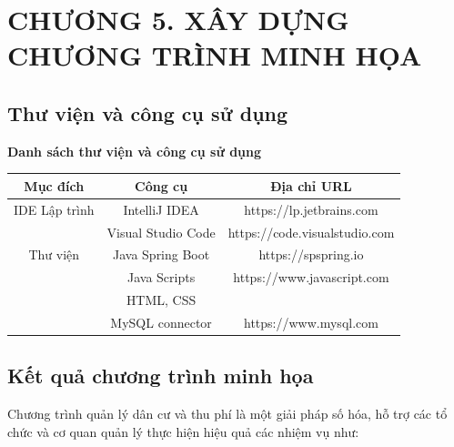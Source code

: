 \documentclass{article}
\begin{document}
\section*{CHƯƠNG 5. XÂY DỰNG CHƯƠNG TRÌNH MINH HỌA}
\setcounter{section}{5}
\setcounter{subsection}{0}
\subsection{Thư viện và công cụ sử dụng}
\begin{center}
    \textbf{Danh sách thư viện và công cụ sử dụng} \\
    \begin{tabular}{|c|c|c|}
        \hline
        \textbf{Mục đích} & \textbf{Công cụ} & \textbf{Địa chỉ URL} \\
        \hline
        IDE Lập trình & IntelliJ IDEA & https://lp.jetbrains.com\\
        &Visual Studio Code & https://code.visualstudio.com\\
        \hline
        Thư viện & Java Spring Boot & https://spspring.io\\
         & Java Scripts & https://www.javascript.com\\
         & HTML, CSS & \\
         & MySQL connector & https://www.mysql.com\\
        \hline
    \end{tabular}
\end{center}
\subsection{Kết quả chương trình minh họa}
Chương trình quản lý dân cư và thu phí là một giải pháp số hóa, hỗ trợ các tổ chức và cơ quan quản lý thực hiện hiệu quả các nhiệm vụ như:
\end{document}
